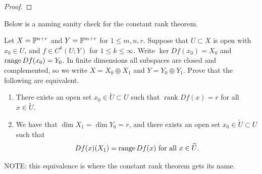 \documentclass[a4paper]{article}
\begin{document}
\begin{proof}
{}
\end{proof}

Below is a naming sanity check for the constant rank theorem.

\begin{thm}
Let $X = \mathbb{F}^{n+r}$ and $Y = \mathbb{F}^{m+r}$ for $1\le m,n,r$.  
Suppose that $U \subset X$ is open with $x_0 \in U$, 
and $f \in C^k(U;Y)$ for $1 \le k \le \infty$.   
Write  $\ker Df(x_0) = X_0$ and $\operatorname{range} Df(x_0) = Y_0$.  
In finite dimensions all subspaces are closed and 
complemented, so we write $X = X_0 \oplus X_1$ and 
$Y = Y_0 \oplus Y_1$.  Prove that the following are 
equivalent.
\begin{enumerate}
 \item There exists an open set $x_0 \in \tilde{U} 
 \subset U$ such that $\operatorname{rank} Df(x) = r$ 
 for all $x \in \tilde{U}$.
 \item We have that $\dim X_1 = \dim Y_0 = r$, 
 and there exists an open set $x_0 \in \tilde{U} 
 \subset U$ such that 
\[
 Df(x)(X_1) = \operatorname{range} Df(x) \text{ for all }x \in \widetilde{U}.
\]
\end{enumerate}
NOTE: this equivalence is where the constant rank 
theorem gets its name.
\end{thm}
\end{document}
